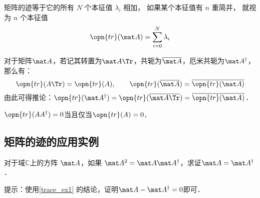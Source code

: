 \begin{theorem}{}
矩阵的迹等于它的所有 $N$ 个本征值 $\lambda_i$ 相加， 如果某个本征值有 $n$ 重简并， 就视为 $n$ 个本征值
\begin{equation}
\opn{tr}(\mat A) = \sum_{i=0}^N \lambda_i
\end{equation}
\end{theorem}


\begin{exercise}{}\label{trace_exe1}
对于矩阵$\mat A$，若记其转置为$\mat A\Tr$，共轭为$\overline{\mat A}$，厄米共轭为$\mat A^\dagger$，那么有：
\begin{equation}
\opn{tr}(A\Tr)=\opn{tr}(A), \qquad \opn{tr}(\overline{\mat A})=\overline{\opn{tr}(\mat A)}
\end{equation}
由此可得推论：$\opn{tr}(\mat A^\dagger)=\opn{tr}(\overline{\mat A\Tr})=\overline{\opn{tr}(\mat A)}$．
\end{exercise}

\begin{example}{}\label{trace_ex1}
$\opn{tr}(AA^\dagger)=0$当且仅当$\opn{tr}(A)=0$．
\end{example}

\subsection{矩阵的迹的应用实例}

\begin{exercise}{}
对于域$\mathbb{C}$上的方阵 $\mat A$，如果 $\mat A^2=\mat A\mat A^\dagger$，求证$\mat A=\mat A^\dagger$．

提示：使用\autoref{trace_ex1} 的结论，证明$\mat A-\mat A^\dagger=0$即可．
\end{exercise}
